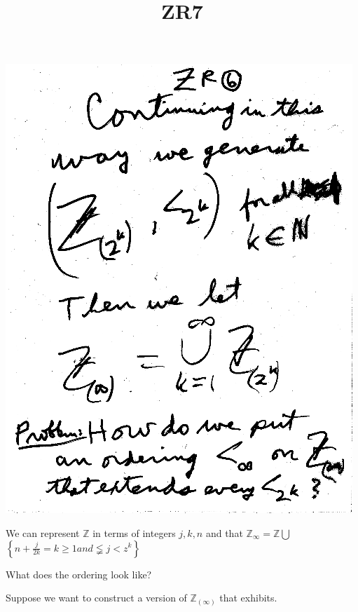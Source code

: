 \documentclass[10pt,a4paper]{article}
\begin{document}
{{\quad
\includegraphics[scale=0.6]{Pages/ZR6.png}

\newpage 
\title{ZR7}
\maketitle

We can represent $\mathbb{Z}$ in terms of integers $j,k,n$ and that $\mathbb{Z} _{\infty} = \mathbb{Z}\bigcup$ $\left\{n+\frac{j}{2k} = k\geqslant1 and \lneqq j < z^k\right\}$

What does the ordering look like? 

Suppose we want to construct a version of $\mathbb{Z}_{(\infty)}$ that exhibits.  

}}
\end{document}
